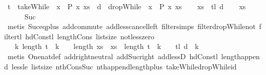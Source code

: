 \begin{isabellebody}
\ {\isacharquery}t\ {\isacharequal}\ {\isachardoublequoteopen}takeWhile\ {\isacharparenleft}{\isasymlambda}\ x{\isachardot}\ {\isasymnot}\ P\ x{\isacharparenright}\ xs{\isachardoublequoteclose}\ \ {\isacharquery}d\ {\isacharequal}\ {\isachardoublequoteopen}dropWhile\ {\isacharparenleft}{\isasymlambda}\ x{\isachardot}\ {\isasymnot}\ P\ x{\isacharparenright}\ xs{\isachardoublequoteclose}\isanewline
\ \ \isamarkupfalse%
\ {\isacharquery}xs\ {\isacharequal}\ {\isachardoublequoteopen}tl\ {\isacharquery}d{\isachardoublequoteclose}\isanewline
\isanewline
\ \ \isamarkupfalse%
\ {\isachardoublequoteopen}{\isacharquery}xs\ {\isasymnoteq}\ {\isacharbrackleft}{\isacharbrackright}{\isachardoublequoteclose}\isanewline
\ \ \ \ \isamarkupfalse%
\ Suc{\isacharparenleft}{}{\isacharparenright}\isanewline
\ \ \ \ \isamarkupfalse%
\ {\isacharparenleft}metis\ Suc{\isacharunderscore}eq{\isacharunderscore}plus{}\ add{\isachardot}commute\ add{\isacharunderscore}less{\isacharunderscore}cancel{\isacharunderscore}left\ filter{\isachardot}simps{\isacharparenleft}{}{\isacharparenright}\ filter{\isacharunderscore}dropWhile{\isacharunderscore}not\ filter{\isacharunderscore}tl\ hd{\isacharunderscore}Cons{\isacharunderscore}tl\ length{\isacharunderscore}Cons\ list{\isachardot}size{\isacharparenleft}{}{\isacharparenright}\ not{\isacharunderscore}less{\isacharunderscore}zero{\isacharparenright}\isanewline
\isanewline
\ \ \isamarkupfalse%
\ {\isacharasterisk}{\isacharcolon}\ {\isachardoublequoteopen}{\isasymforall}\ k{\isachardot}\ length\ {\isacharquery}t\ {\isacharplus}\ k\ {\isacharplus}\ {}\ {\isacharless}\ length\ xs\ {\isasymlongrightarrow}\ xs\ {\isacharbang}\ {\isacharparenleft}length\ {\isacharquery}t\ {\isacharplus}\ k\ {\isacharplus}\ {}{\isacharparenright}\ {\isacharequal}\ tl\ {\isacharquery}d\ {\isacharbang}\ k{\isachardoublequoteclose}\isanewline
\ \ \ \ \isamarkupfalse%
\ {\isacharparenleft}metis\ One{\isacharunderscore}nat{\isacharunderscore}def\ add{\isachardot}right{\isacharunderscore}neutral\ add{\isacharunderscore}Suc{\isacharunderscore}right\ add{\isacharunderscore}lessD{}\ hd{\isacharunderscore}Cons{\isacharunderscore}tl\ length{\isacharunderscore}append\ less{\isacharunderscore}le\ list{\isachardot}size{\isacharparenleft}{}{\isacharparenright}\ nth{\isacharunderscore}Cons{\isacharunderscore}Suc\ nth{\isacharunderscore}append{\isacharunderscore}length{\isacharunderscore}plus\ takeWhile{\isacharunderscore}dropWhile{\isacharunderscore}id{\isacharparenright}\isanewline

\end{isabellebody}
